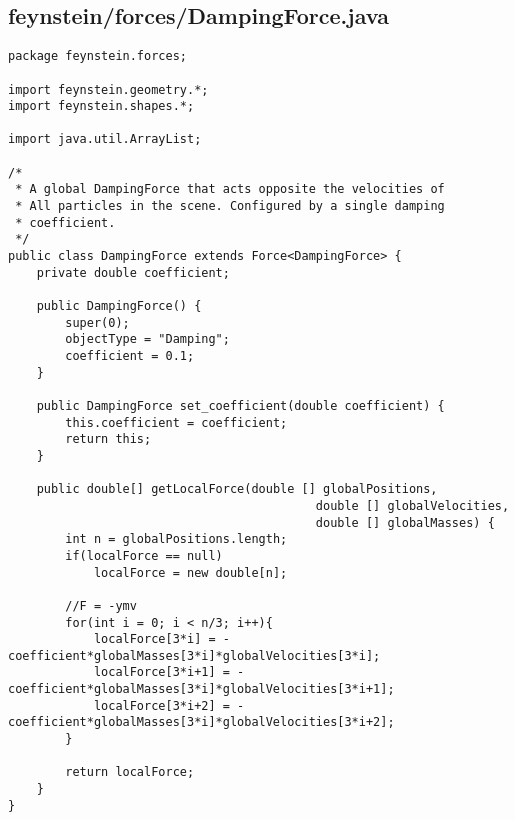 \subsection*{feynstein/forces/DampingForce.java}
\begin{lstlisting}
package feynstein.forces;

import feynstein.geometry.*;
import feynstein.shapes.*;

import java.util.ArrayList;

/*
 * A global DampingForce that acts opposite the velocities of
 * All particles in the scene. Configured by a single damping
 * coefficient.
 */
public class DampingForce extends Force<DampingForce> {
	private double coefficient;

    public DampingForce() {
		super(0);
		objectType = "Damping";
		coefficient = 0.1;
    }
 
    public DampingForce set_coefficient(double coefficient) {
		this.coefficient = coefficient;
		return this;
    }

	public double[] getLocalForce(double [] globalPositions,
										   double [] globalVelocities,
										   double [] globalMasses) {
		int n = globalPositions.length;
		if(localForce == null)
			localForce = new double[n];
		
		//F = -ymv
		for(int i = 0; i < n/3; i++){
			localForce[3*i] = -coefficient*globalMasses[3*i]*globalVelocities[3*i];
			localForce[3*i+1] = -coefficient*globalMasses[3*i]*globalVelocities[3*i+1];
			localForce[3*i+2] = -coefficient*globalMasses[3*i]*globalVelocities[3*i+2];
		}
		
		return localForce;
	}
}
\end{lstlisting}

